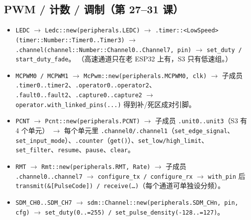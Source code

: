 \documentclass[UTF8,a4paper,11pt,fontset=fandol]{ctexart}
\newcommand{\fld}[1]{\texttt{#1}}
\begin{document}
\subsection{PWM / 计数 / 调制（第 27--31 课）}
\begin{itemize}
  \item \fld{LEDC} $\rightarrow$ \fld{Ledc::new(peripherals.LEDC)}
    $\rightarrow$ \fld{.timer::<LowSpeed>}\allowbreak\fld{(timer::Number::Timer0..Timer3)}
    $\rightarrow$ \fld{.channel(channel::Number::Channel0..Channel7, pin)}
    $\rightarrow$ \fld{set\_duty / start\_duty\_fade}。
    （高速通道只在老 ESP32 上有，S3 只有低速组。）
  \item \fld{MCPWM0 / MCPWM1} $\rightarrow$ \fld{McPwm::new(peripherals.MCPWM0, clk)}
    $\rightarrow$ 子成员 \fld{.timer0..timer2}、\fld{.operator0..operator2}、
    \fld{.fault0..fault2}、\fld{.capture0..capture2}
    $\rightarrow$ \fld{operator.with\_linked\_pins(...)} 得到补/死区成对引脚。
  \item \fld{PCNT} $\rightarrow$ \fld{Pcnt::new(peripherals.PCNT)}
    $\rightarrow$ 子成员 \fld{.unit0..unit3}（S3 有 4 个单元）
    $\rightarrow$ 每个单元里 \fld{.channel0/.channel1}（\fld{set\_edge\_signal}、
    \fld{set\_input\_mode}）、\fld{.counter}（\fld{get()}）、\fld{set\_low/high\_limit}、
    \fld{set\_filter}、\fld{resume}、\fld{pause}、\fld{clear}。
  \item \fld{RMT} $\rightarrow$ \fld{Rmt::new(peripherals.RMT, Rate)}
    $\rightarrow$ 子成员 \fld{.channel0..channel7}
    $\rightarrow$ \fld{configure\_tx / configure\_rx} $\rightarrow$ \fld{with\_pin} 后
    \fld{transmit(\&[PulseCode]) / receive(\dots)}（每个通道可单独设分频）。
  \item \fld{SDM\_CH0..SDM\_CH7} $\rightarrow$ \fld{sdm::Channel::new(peripherals.SDM\_CHn, pin, cfg)}
    $\rightarrow$ \fld{set\_duty(0..=255) / set\_pulse\_density(-128..=127)}。
\end{itemize}
\end{document}
